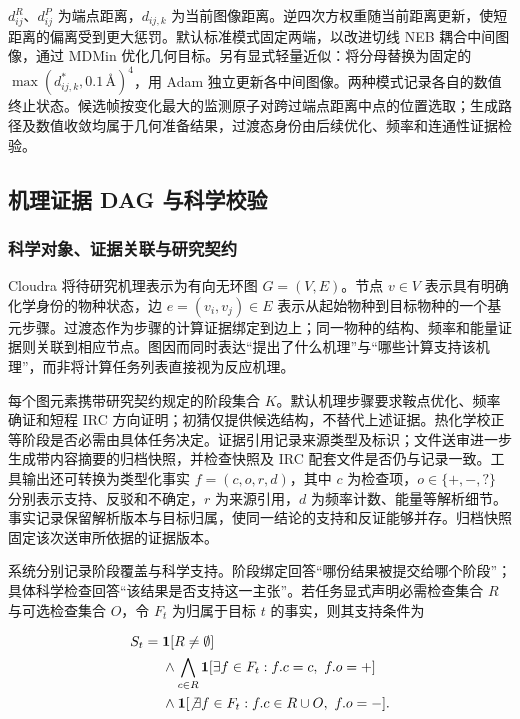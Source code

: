 $d^R_{ij}$、$d^P_{ij}$ 为端点距离，$d_{ij,k}$ 为当前图像距离。逆四次方权重随当前距离更新，使短距离的偏离受到更大惩罚。默认标准模式固定两端，以改进切线 NEB 耦合中间图像，通过 MDMin 优化几何目标。另有显式轻量近似：将分母替换为固定的 $\max(d^*_{ij,k},0.1\,\text{Å})^4$，用 Adam 独立更新各中间图像。两种模式记录各自的数值终止状态。候选帧按变化最大的监测原子对跨过端点距离中点的位置选取；生成路径及数值收敛均属于几何准备结果，过渡态身份由后续优化、频率和连通性证据检验。

\subsection{机理证据 DAG 与科学校验}

\subsubsection{科学对象、证据关联与研究契约}

Cloudra 将待研究机理表示为有向无环图 $G=(V,E)$。节点 $v\in V$ 表示具有明确化学身份的物种状态，边 $e=(v_i,v_j)\in E$ 表示从起始物种到目标物种的一个基元步骤。过渡态作为步骤的计算证据绑定到边上；同一物种的结构、频率和能量证据则关联到相应节点。图因而同时表达“提出了什么机理”与“哪些计算支持该机理”，而非将计算任务列表直接视为反应机理。

每个图元素携带研究契约规定的阶段集合 $K$。默认机理步骤要求鞍点优化、频率确证和短程 IRC 方向证明；初猜仅提供候选结构，不替代上述证据。热化学校正等阶段是否必需由具体任务决定。证据引用记录来源类型及标识；文件送审进一步生成带内容摘要的归档快照，并检查快照及 IRC 配套文件是否仍与记录一致。工具输出还可转换为类型化事实 $f=(c,o,r,d)$，其中 $c$ 为检查项，$o\in\{+,-,?\}$ 分别表示支持、反驳和不确定，$r$ 为来源引用，$d$ 为频率计数、能量等解析细节。事实记录保留解析版本与目标归属，使同一结论的支持和反证能够并存。归档快照固定该次送审所依据的证据版本。

系统分别记录阶段覆盖与科学支持。阶段绑定回答“哪份结果被提交给哪个阶段”；具体科学检查回答“该结果是否支持这一主张”。若任务显式声明必需检查集合 $R$ 与可选检查集合 $O$，令 $F_t$ 为归属于目标 $t$ 的事实，则其支持条件为

\begin{equation}\label{eq:methods-9}
\begin{aligned}
S_t={}&\mathbf 1[R\ne\emptyset]\\
&\land\bigwedge_{c\in R}\mathbf 1[\exists f\in F_t:f.c=c,\ f.o=+]\\
&\land\mathbf 1[\not\exists f\in F_t:f.c\in R\cup O,\ f.o=-].
\end{aligned}
\end{equation}

